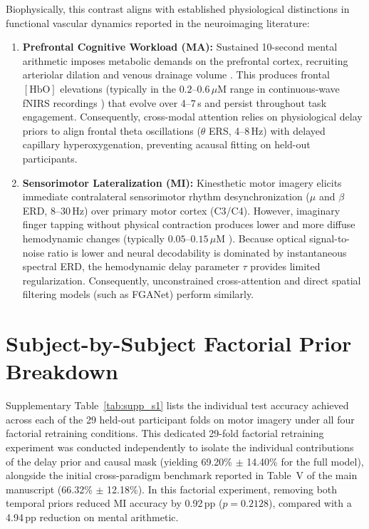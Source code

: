 \documentclass[journal]{IEEEtran}
\begin{document}
Biophysically, this contrast aligns with established physiological distinctions in functional vascular dynamics reported in the neuroimaging literature:
\begin{enumerate}
    \item \textbf{Prefrontal Cognitive Workload (MA):} Sustained 10-second mental arithmetic imposes metabolic demands on the prefrontal cortex, recruiting arteriolar dilation and venous drainage volume \cite{buxton1998dynamics, scholkmann2014review}. This produces frontal $[\mathrm{HbO}]$ elevations (typically in the $0.2\text{--}0.6\,\mu\mathrm{M}$ range in continuous-wave fNIRS recordings \cite{shin2017open}) that evolve over 4--7\,s and persist throughout task engagement. Consequently, cross-modal attention relies on physiological delay priors to align frontal theta oscillations ($\theta$ ERS, 4--8\,Hz) with delayed capillary hyperoxygenation, preventing acausal fitting on held-out participants.
    \item \textbf{Sensorimotor Lateralization (MI):} Kinesthetic motor imagery elicits immediate contralateral sensorimotor rhythm desynchronization ($\mu$ and $\beta$ ERD, 8--30\,Hz) over primary motor cortex (C3/C4). However, imaginary finger tapping without physical contraction produces lower and more diffuse hemodynamic changes (typically $0.05\text{--}0.15\,\mu\mathrm{M}$ \cite{shin2017open, pinti2020present}). Because optical signal-to-noise ratio is lower and neural decodability is dominated by instantaneous spectral ERD, the hemodynamic delay parameter $\tau$ provides limited regularization. Consequently, unconstrained cross-attention and direct spatial filtering models (such as FGANet) perform similarly.
\end{enumerate}

\section{Subject-by-Subject Factorial Prior Breakdown}
\label{sec:supp_breakdown}

Supplementary Table~\ref{tab:supp_s1} lists the individual test accuracy achieved across each of the 29 held-out participant folds on motor imagery under all four factorial retraining conditions. This dedicated 29-fold factorial retraining experiment was conducted independently to isolate the individual contributions of the delay prior and causal mask (yielding 69.20\% $\pm$ 14.40\% for the full model), alongside the initial cross-paradigm benchmark reported in Table~V of the main manuscript (66.32\% $\pm$ 12.18\%). In this factorial experiment, removing both temporal priors reduced MI accuracy by 0.92\,pp ($p = 0.2128$), compared with a 4.94\,pp reduction on mental arithmetic.
\end{document}
